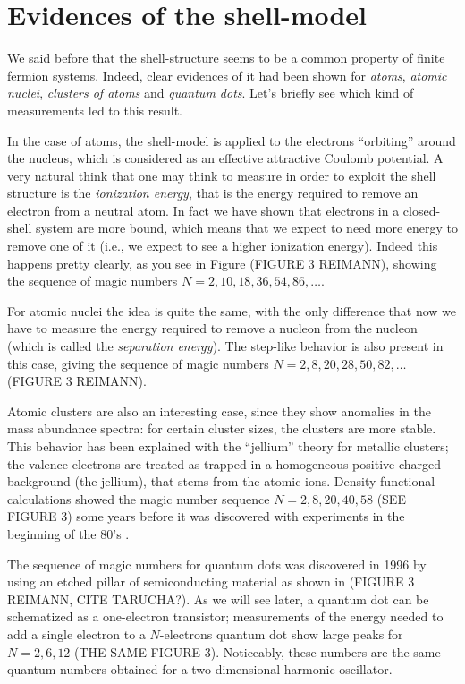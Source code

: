 \documentclass[a4paper,twoside,11pt]{book}
\begin{document}
\section{Evidences of the shell-model}
\label{sec:shell_model_evidences}
We said before that the shell-structure seems to be a common property of finite fermion systems. Indeed, clear evidences of it had been shown for \emph{atoms}, \emph{atomic nuclei}, \emph{clusters of atoms} and \emph{quantum dots}. Let's briefly see which kind of measurements led to this result.

In the case of atoms, the shell-model is applied to the electrons ``orbiting'' around the nucleus, which is considered as an effective attractive Coulomb potential. A very natural think that one may think to measure in order to exploit the shell structure is the \emph{ionization energy}, that is the energy required to remove an electron from a neutral atom. In fact we have shown that electrons in a closed-shell system are more bound, which means that we expect to need more energy to remove one of it (i.e., we expect to see a higher ionization energy). Indeed this happens pretty clearly, as you see in Figure (FIGURE 3 REIMANN), showing the sequence of magic numbers $N=2,10,18,36,54,86,\ldots$.

For atomic nuclei the idea is quite the same, with the only difference that now we have to measure the energy required to remove a nucleon from the nucleon (which is called the \emph{separation energy}). The step-like behavior is also present in this case, giving the sequence of magic numbers $N=2,8,20,28,50,82,\ldots$ (FIGURE 3 REIMANN).

Atomic clusters are also an interesting case, since they show anomalies in the mass abundance spectra: for certain cluster sizes, the clusters are more stable. This behavior has been explained with the ``jellium'' theory for metallic clusters; the valence electrons are treated as trapped in a homogeneous positive-charged background (the jellium), that stems from the atomic ions. Density functional calculations showed the magic number sequence $N=2,8,20,40,58$ (SEE FIGURE 3) some years before it was discovered with experiments in the beginning of the 80's \citep[see][]{Reimann2002}.

The sequence of magic numbers for quantum dots was discovered in 1996 by using an etched pillar of semiconducting material as shown in (FIGURE 3 REIMANN, CITE TARUCHA?). As we will see later, a quantum dot can be schematized as a one-electron transistor; measurements of the energy needed to add a single electron to a $N$-electrons quantum dot show large peaks for $N=2,6,12$ (THE SAME FIGURE 3). Noticeably, these numbers are the same quantum numbers obtained for a two-dimensional harmonic oscillator.
\end{document}
